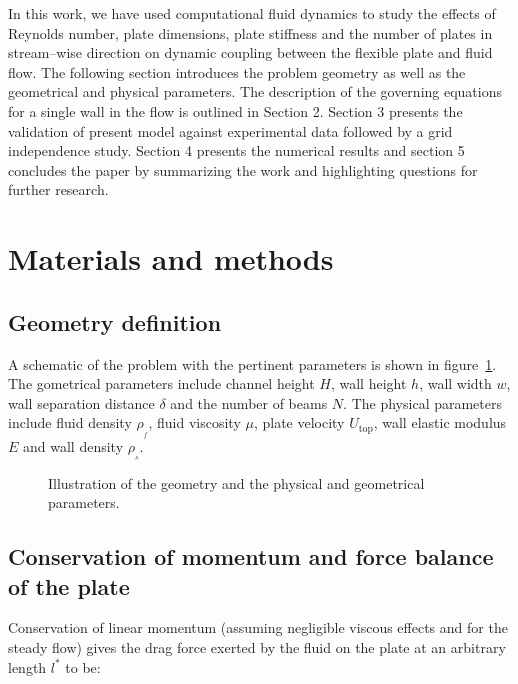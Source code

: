 \documentclass[preprint, letterpaper, nobibnotes, aps, superscriptaddress,prb]{revtex4-1}
\begin{document}
In this work, we have used computational fluid dynamics to study the effects of Reynolds number, plate dimensions, plate stiffness and the number of plates in stream--wise direction on dynamic coupling between the flexible plate and fluid flow. The following section introduces the problem geometry as well as the geometrical and physical parameters. The description of the governing equations for a single wall in the flow is outlined in Section 2. Section 3 presents the validation of present model against experimental data followed by a grid independence study. Section 4 presents the numerical results and section 5 concludes the paper by summarizing the work and highlighting questions for further research.





\section{Materials and methods}



\subsection{Geometry definition}

A schematic of the problem with the pertinent parameters is shown in figure~\ref{fig:schematic}. The gometrical parameters include channel height $H$, wall height $h$, wall width $w$, wall separation distance $\delta$ and the number of beams $N$. The physical parameters include fluid density $\rho_{_f}$, fluid viscosity $\mu$, plate velocity $U_{\mathrm{top}}$, wall elastic modulus $E$ and wall density $\rho_{_s}$.

\begin{figure}[h]
\centering {}
\caption{Illustration of the geometry and the physical and geometrical parameters.}\protect\label{fig:schematic} 
\end{figure}

\subsection{Conservation of momentum and force balance of the plate}


Conservation of linear momentum (assuming negligible viscous effects and for the steady flow) gives the drag force exerted by the fluid on the plate at an arbitrary length $l^{*}$ to be:
\end{document}
